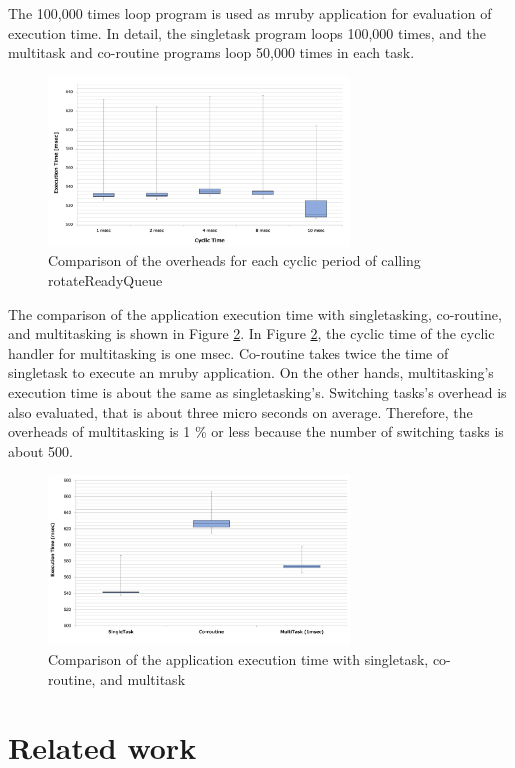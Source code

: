\documentclass[conference,compsoc]{IEEEtran}
\begin{document}
The 100,000 times loop program is used as mruby application for evaluation of execution time.
In detail, the singletask program loops 100,000 times, and the multitask and co-routine programs loop 50,000 times in each task.

\begin{figure}[t]
    \centering
    \includegraphics[width=8cm,clip]{figure/comparison_msec.pdf}
    \caption{Comparison of the overheads for each cyclic period of calling rotateReadyQueue}
    \label{fig:comparison_msec}
\end{figure}

The comparison of the application execution time with singletasking, co-routine, and multitasking is shown in Figure \ref{fig:comparison_s_c_m}.
In Figure \ref{fig:comparison_s_c_m}, the cyclic time of the cyclic handler for multitasking is one msec.
Co-routine takes twice the time of singletask to execute an mruby application.
On the other hands, multitasking's execution time is about the same as singletasking's.
Switching tasks's overhead is also evaluated, that is about three micro seconds on average.
Therefore, the overheads of multitasking is 1 \% or less because the number of switching tasks is about 500.

\begin{figure}[t]
    \centering
    \includegraphics[width=8cm,clip]{figure/comparison_s_c_m.pdf}
    \caption{Comparison of the application execution time with singletask, co-routine, and multitask}
    \label{fig:comparison_s_c_m}
\end{figure}

\section{Related work}
\label{sec:Related work}
\end{document}
